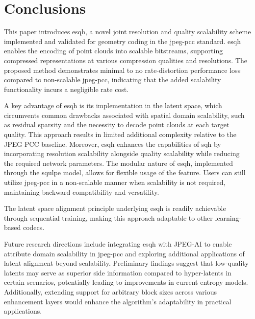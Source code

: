 \section{Conclusions}
\label{sec:conclusions}
This paper introduces \gls{esqh}, a novel joint resolution and quality scalability scheme implemented and validated for geometry coding in the \gls{jpeg-pcc} standard. \gls{esqh} enables the encoding of point clouds into scalable bitstreams, supporting compressed representations at various compression qualities and resolutions.
The proposed method demonstrates minimal to no rate-distortion performance loss compared to non-scalable \gls{jpeg-pcc}, indicating that the added scalability functionality incurs a negligible rate cost.

A key advantage of \gls{esqh} is its implementation in the latent space, which circumvents common drawbacks associated with spatial domain scalability, such as residual sparsity and the necessity to decode point clouds at each target quality. This approach results in limited additional complexity relative to the JPEG PCC baseline. Moreover, \gls{esqh} enhances the capabilities of \gls{sqh} by incorporating resolution scalability alongside quality scalability while reducing the required network parameters. The modular nature of \gls{esqh}, implemented through the \gls{squlpe} model, allows for flexible usage of the feature. Users can still utilize \gls{jpeg-pcc} in a non-scalable manner when scalability is not required, maintaining backward compatibility and versatility.

The latent space alignment principle underlying \gls{esqh} is readily achievable through sequential training, making this approach adaptable to other learning-based codecs.

Future research directions include integrating \gls{esqh} with JPEG-AI to enable attribute domain scalability in \gls{jpeg-pcc} and exploring additional applications of latent alignment beyond scalability. Preliminary findings suggest that low-quality latents may serve as superior side information compared to hyper-latents in certain scenarios, potentially leading to improvements in current entropy models. Additionally, extending support for arbitrary block sizes across various enhancement layers would enhance the algorithm's adaptability in practical applications.

